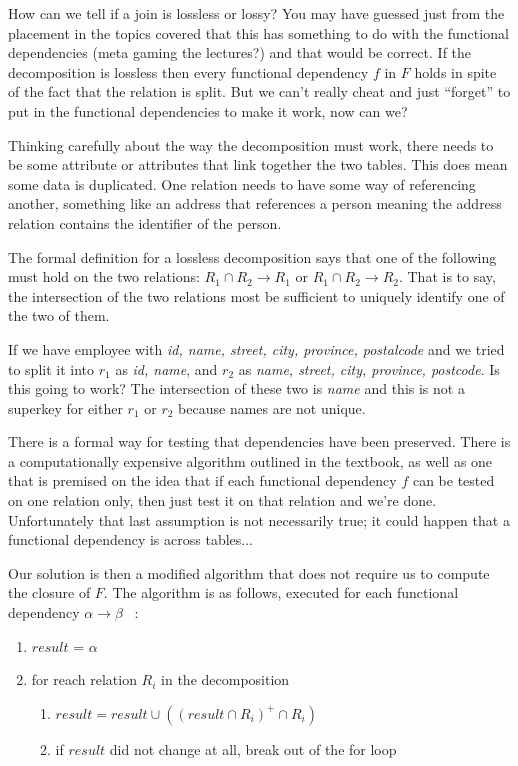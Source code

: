 \documentclass[a4paper]{report}
\begin{document}
How can we tell if a join is lossless or lossy? You may have guessed just from the placement in the topics covered that this has something to do with the functional dependencies (meta gaming the lectures?) and that would be correct. If the decomposition is lossless then every functional dependency $f$ in $F$ holds in spite of the fact that the relation is split. But we can't really cheat and just ``forget'' to put in the functional dependencies to make it work, now can we?

Thinking carefully about the way the decomposition must work, there needs to be some attribute or attributes that link together the two tables. This does mean some data is duplicated. One relation needs to have some way of referencing another, something like an address that references a person meaning the address relation contains the identifier of the person. 

The formal definition for a lossless decomposition says that one of the following must hold on the two relations: $R_{1} \cap R_{2} \rightarrow R_{1}$ or  $R_{1} \cap R_{2} \rightarrow R_{2}$. That is to say, the intersection of the two relations most be sufficient to uniquely identify one of the two of them. 

If we have employee with \textit{id, name, street, city, province, postalcode} and we tried to split it into $r_{1}$ as \textit{id, name}, and $r_{2}$ as \textit{name, street, city, province, postcode}. Is this going to work? The intersection of these two is \textit{name} and this is not a superkey for either $r_{1}$ or $r_{2}$ because names are not unique.

There is a formal way for testing that dependencies have been preserved. There is a computationally expensive algorithm outlined in the textbook, as well as one that is premised on the idea that if each functional dependency $f$ can be tested on one relation only, then just test it on that relation and we're done. Unfortunately that last assumption is not necessarily true; it could happen that a functional dependency is across tables...

Our solution is then a modified algorithm that does not require us to compute the closure of $F$. The algorithm is as follows, executed for each functional dependency $\alpha \rightarrow \beta$ ~\cite{dsc}:


\begin{enumerate}
	\item $result$ = $\alpha$
	\item for reach relation $R_{i}$ in the decomposition
	\begin{enumerate}
		\item $result = result \cup (  (result \cap R_{i})^{+} \cap R_{i} )$
	    \item if $result$ did not change at all, break out of the for loop
	    \end{enumerate}
\end{enumerate}
\end{document}
